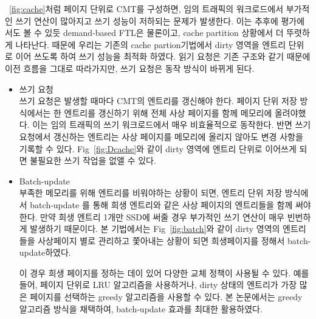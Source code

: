 \documentclass[conference]{IEEEtran}
\begin{document}
~\ref{fig:cache}처럼 페이지 단위로 CMT를 구성하면, 임의 트래픽의 워크로드에서 부가적인 쓰기 연산이 많아지고 쓰기 성능이 저하되는 문제가 발생한다. 이는 추후에 평가에서도 볼 수 있듯 demand-based FTL은 물론이고, cache partition 상황에서 더 뚜렷하게 나타난다. 때문에 우리는 기존의 cache partion기법에서 dirty 영역을 엔트리 단위로 이어 쓰도록 하여 쓰기 성능을 최적화 하였다. 읽기 요청은 기존 구조와 같기 때문에 이전 흐름을 그대로 따라가지만, 쓰기 요청은 동작 방식이 바뀌게 된다.
\begin{itemize}
	\item{쓰기 요청}\\
	쓰기 요청은 발생할 때마다 CMT의 엔트리를 갱신해야 한다. 페이지 단위 저장 방식에서는 한 엔트리를 갱신하기 위해 전체 사상 페이지를 함께 메모리에 올려야했다. 이는 임의 트래픽의 쓰기 워크로드에서 매우 비효율적으로 동작한다. 반면 쓰기 요청에서 갱신하는 엔트리는 사상 페이지를 메모리에 올리지 않아도 변경 사항을 기록할 수 있다. Fig~\ref{fig:Dcache}와 같이 dirty 영역에 엔트리 단위로 이어쓰게 되면 불필요한 쓰기 작업을 없앨 수 있다. 
	\item{Batch-update}\\
	부족한 메모리를 위해 엔트리를 비워야하는 상황이 되면, 엔트리 단위 저장 방식에서 batch-update 를 통해 희생 엔트리와 같은 사상 페이지의 엔트리들을 함께 써야 한다. 만약 희생 엔트리 1개만 SSD에 써줄 경우 부가적인 쓰기 연산이 매우 빈번하게 발생하기 때문이다. 본 기법에서는 Fig~\ref{fig:batch}와 같이 dirty 영역의 엔트리들을 사상페이지 별로 관리하고 쫓아내는 상황이 되면 희생페이지를 정해서 batch-update하였다.\par
	이 경우 희생 페이지를 정하는 데이 있어 다양한 교체 정책이 사용될 수 있다. 예를 들어, 페이지 단위로 LRU 알고리즘을 사용하거나, dirty 상태의 엔트리가 가장 많은 페이지를 선택하는 greedy 알고리즘을 사용할 수 있다. 본 논문에서는 greedy 알고리즘 방식을 채택하여, batch-update 효과를 최대한 활용하였다.
\end{itemize}
\end{document}

